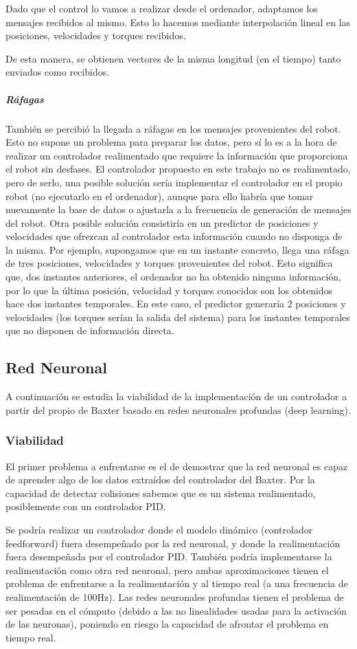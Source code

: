 Dado que el control lo vamos a realizar desde el ordenador, adaptamos los mensajes recibidos al mismo. Esto lo hacemos mediante interpolación lineal en las posiciones, velocidades y torques recibidos.

De esta manera, se obtienen vectores de la misma longitud (en el tiempo) tanto enviados como recibidos.

\subparagraph{Ráfagas}
También se percibió la llegada a ráfagas en los mensajes provenientes del robot. Esto no supone un problema para preparar los datos, pero sí lo es a la hora de realizar un controlador realimentado que requiere la información que proporciona el robot sin desfases. El controlador propuesto en este trabajo no es realimentado, pero de serlo, una posible solución sería implementar el controlador en el propio robot (no ejecutarlo en el ordenador), aunque para ello habría que tomar nuevamente la base de datos o ajustarla a la frecuencia de generación de mensajes del robot. Otra posible solución consistiría en un predictor de posiciones y velocidades que ofrezcan al controlador esta información cuando no disponga de la misma. Por ejemplo, supongamos que en un instante concreto, llega una ráfaga de tres posiciones, velocidades y torques provenientes del robot. Esto significa que, dos instantes anteriores, el ordenador no ha obtenido ninguna información, por lo que la última posición, velocidad y torques conocidos son los obtenidos hace dos instantes temporales. En este caso, el predictor generaría 2 posiciones y velocidades (los torques serían la salida del sistema) para los instantes temporales que no disponen de información directa.


\subsection{Red Neuronal}
A continuación se estudia la viabilidad de la implementación de un controlador a partir del propio de Baxter basado en redes neuronales profundas (deep learning).
\subsubsection{Viabilidad}
El primer problema a enfrentarse es el de demostrar que la red neuronal es capaz de aprender algo de los datos extraídos del controlador del Baxter. Por la capacidad de detectar colisiones sabemos que es un sistema realimentado, posiblemente con un controlador PID.

Se podría realizar un controlador donde el modelo dinámico (controlador feedforward) fuera desempeñado por la red neuronal, y donde la realimentación fuera desempeñada por el controlador PID. También podría implementarse la realimentación como otra red neuronal, pero ambas aproximaciones tienen el problema de enfrentarse a la realimentación y al tiempo real (a una frecuencia de realimentación de 100Hz). Las redes neuronales profundas tienen el problema de ser pesadas en el cómputo (debido a las no linealidades usadas para la activación de las neuronas), poniendo en riesgo la capacidad de afrontar el problema en tiempo real.

